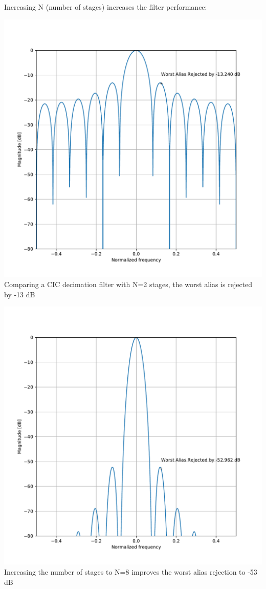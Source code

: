 \documentclass{article}
\begin{document}
Increasing N (number of stages) increases the filter performance:

\begin{center}
	\begin{minipage}{0.49\linewidth}
		\includegraphics[width=0.99\linewidth]{cic_r12_n2.pdf} \\
		Comparing a CIC decimation filter with N=2 stages,
		the worst alias is rejected by -13 dB
	\end{minipage}
	\begin{minipage}{0.49\linewidth}
		\includegraphics[width=0.99\linewidth]{cic_r12_n8.pdf} \\
		Increasing the number of stages to N=8
		improves the worst alias rejection to -53 dB
	\end{minipage}
\end{center}
\end{document}
